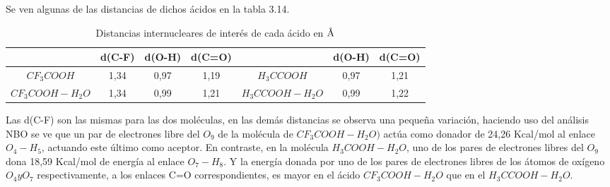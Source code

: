  Se ven algunas de las distancias de dichos ácidos en la tabla 3.14.
 \begin{table}[H]
 	\centering
 	\begin{tabular}{|c|c|c|c|c|c|c|}
 		\hline
 			 & d(C-F)	& d(O-H) & d(C=O) & & d(O-H) & d(C=O) \\ \hline
$CF_3COOH$ & 1,34 & 0,97 & 1,19 & $H_3CCOOH$ & 0,97 &1,21 \\ \hline $CF_3COOH-H_2O$	& 1,34 & 0,99 & 1,21 & $H_3CCOOH-H_2O$	& 0,99 &1,22 \\ \hline
 	\end{tabular}
 \caption{Distancias internucleares de interés de cada ácido en $\mbox{\normalfont\AA}$}
 \end{table}
Las d(C-F) son las mismas para las dos moléculas, en las demás distancias se observa una pequeña variación, haciendo uso del análisis NBO se ve que un par de electrones libre del $O_9$ de la molécula de $CF_3COOH-H_2O)$ actúa como donador de 24,26 Kcal/mol al enlace $O_4 - H_5$, actuando este último como aceptor. En contraste, en la molécula $H_3COOH-H_2O$, uno de los pares de electrones libres del $O_9$ dona 18,59 Kcal/mol de energía al enlace $O_7-H_8$. Y la energía donada por uno de los pares de electrones libres de los átomos de oxígeno $O_4 y O_7$ respectivamente, a los enlaces C=O correspondientes, es mayor en el ácido $CF_3COOH-H_2O$ que en el $H_3CCOOH-H_2O$.

